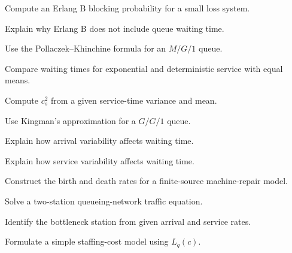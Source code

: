 \begin{exercise}[3]
Compute an Erlang B blocking probability for a small loss system.
\end{exercise}

\begin{exercise}[3]
Explain why Erlang B does not include queue waiting time.
\end{exercise}

\begin{exercise}[3]
Use the Pollaczek--Khinchine formula for an \(M/G/1\) queue.
\end{exercise}

\begin{exercise}[3]
Compare waiting times for exponential and deterministic service with equal
means.
\end{exercise}

\begin{exercise}[3]
Compute \(c_s^2\) from a given service-time variance and mean.
\end{exercise}

\begin{exercise}[3]
Use Kingman's approximation for a \(G/G/1\) queue.
\end{exercise}

\begin{exercise}[3]
Explain how arrival variability affects waiting time.
\end{exercise}

\begin{exercise}[3]
Explain how service variability affects waiting time.
\end{exercise}

\begin{exercise}[3]
Construct the birth and death rates for a finite-source machine-repair
model.
\end{exercise}

\begin{exercise}[3]
Solve a two-station queueing-network traffic equation.
\end{exercise}

\begin{exercise}[3]
Identify the bottleneck station from given arrival and service rates.
\end{exercise}

\begin{exercise}[3]
Formulate a simple staffing-cost model using \(L_q(c)\).
\end{exercise}

